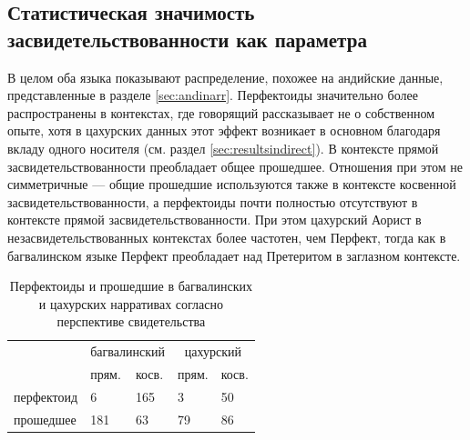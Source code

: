 \subsection{Статистическая значимость засвидетельствованности как параметра} \label{sec:statistics}

В целом оба языка показывают распределение, похожее на андийские данные, представленные в разделе \ref{sec:andinarr}. Перфектоиды значительно более распространены в контекстах, где говорящий рассказывает не о собственном опыте, хотя в цахурских данных этот эффект возникает в основном благодаря вкладу одного носителя (см. раздел \ref{sec:resultsindirect}). В контексте прямой засвидетельствованности преобладает общее прошедшее. Отношения при этом не симметричные ---  общие прошедшие используются также в контексте косвенной засвидетельствованности, а перфектоиды почти полностью отсутствуют в контексте прямой засвидетельствованности. При этом цахурский Аорист в незасвидетельствованных контекстах более частотен, чем Перфект, тогда как в багвалинском языке Перфект преобладает над Претеритом в заглазном контексте.

\begin{table}[h]
\caption{Перфектоиды и прошедшие в багвалинских и цахурских нарративах согласно перспективе свидетельства}
\label{tab:conting}
\vspace{0.2cm}
\begin{center}
\begin{tabular}{lllll}
                                & \multicolumn{2}{c}{багвалинский} & \multicolumn{2}{c}{цахурский} \\ \cline{2-5} 
                                & прям.           & косв.          & прям.         & косв.         \\ \hline
\multicolumn{1}{l|}{перфектоид} & 6               & 165            & 3             & 50            \\
\multicolumn{1}{l|}{прошедшее}  & 181             & 63             & 79            & 86           
\end{tabular}
\end{center}
\end{table}



